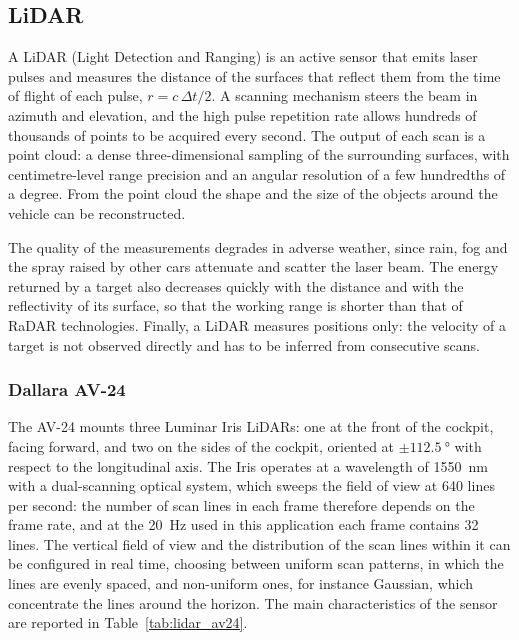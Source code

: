 \subsection{LiDAR}
\label{subsec:lidar}

A LiDAR (Light Detection and Ranging) is an active sensor that emits laser pulses and
measures the distance of the surfaces that reflect them from the time of flight of each
pulse, $r = c\,\Delta t/2$. A scanning mechanism steers the beam in azimuth and
elevation, and the high pulse repetition rate allows hundreds of thousands of points to
be acquired every second. The output of each scan is a point cloud: a dense
three-dimensional sampling of the surrounding surfaces, with centimetre-level range
precision and an angular resolution of a few hundredths of a degree. From the point cloud
the shape and the size of the objects around the vehicle can be reconstructed.

The quality of the measurements degrades in
adverse weather, since rain, fog and the spray raised by other cars attenuate and
scatter the laser beam. The energy returned by a target also decreases quickly
with the distance and with the reflectivity of its surface, so that the working range
is shorter than that of RaDAR technologies. Finally, a LiDAR measures positions only:
the velocity of a target is not observed directly and has to be inferred from
consecutive scans.

\subsubsection{Dallara AV-24}

The AV-24 mounts three Luminar Iris LiDARs: one at the front of the cockpit, facing
forward, and two on the sides of the cockpit, oriented at $\pm\SI{112.5}{\degree}$
with respect to the longitudinal axis. The Iris operates at a wavelength of \SI{1550}{nm}
with a dual-scanning optical system, which sweeps the field of view at 640 lines per
second: the number of scan lines in each frame therefore depends on the frame rate, and
at the \SI{20}{Hz} used in this application each frame contains 32 lines. The vertical
field of view and the distribution of the scan lines within it
can be configured in real time, choosing between uniform scan patterns, in which the lines
are evenly spaced, and non-uniform ones, for instance Gaussian, which concentrate the
lines around the horizon. The main characteristics of the sensor are reported in
Table~\ref{tab:lidar_av24}.

